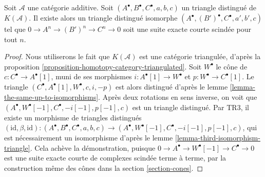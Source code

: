 \begin{lemma}
\label{lemma-improve-distinguished-triangle-homotopy}
Soit $\mathcal{A}$ une catégorie additive. Soit
$(A^\bullet, B^\bullet, C^\bullet, a, b, c)$ un triangle distingué de
$K(\mathcal{A})$. Il existe alors un triangle distingué isomorphe
$(A^\bullet, (B')^\bullet, C^\bullet, a', b', c)$ tel que
$0 \to A^n \to (B')^n \to C^n \to 0$ soit une suite exacte courte scindée
pour tout $n$.
\end{lemma}

\begin{proof}
Nous utiliserons le fait que $K(\mathcal{A})$ est une catégorie triangulée,
d'après la proposition \ref{proposition-homotopy-category-triangulated}.
Soit $W^\bullet$ le cône de $c : C^\bullet \to A^\bullet[1]$, muni de ses
morphismes $i : A^\bullet[1] \to W^\bullet$ et
$p : W^\bullet \to C^\bullet[1]$. Le triangle
$(C^\bullet, A^\bullet[1], W^\bullet, c, i, -p)$ est alors distingué d'après le
lemme \ref{lemma-the-same-up-to-isomorphisms}. Après deux rotations en sens
inverse, on voit que
$(A^\bullet, W^\bullet[-1], C^\bullet, -i[-1], p[-1], c)$ est un triangle
distingué. Par TR3, il existe un morphisme de triangles distingués
$(\text{id}, \beta, \text{id}) : (A^\bullet, B^\bullet, C^\bullet, a, b, c) \to
(A^\bullet, W^\bullet[-1], C^\bullet, -i[-1], p[-1], c)$,
qui est nécessairement un isomorphisme d'après le
lemme \ref{lemma-third-isomorphism-triangle}. Cela achève la démonstration,
puisque $0 \to A^\bullet \to W^\bullet[-1] \to C^\bullet \to 0$ est une suite
exacte courte de complexes scindée terme à terme, par la construction même des
cônes dans la section \ref{section-cones}.
\end{proof}

